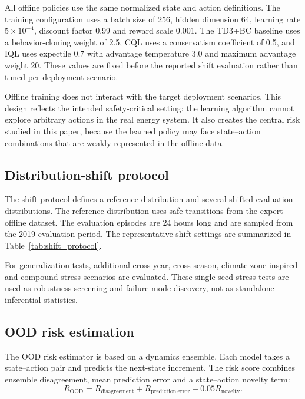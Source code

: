 \documentclass[preprint,12pt]{elsarticle}
\begin{document}
All offline policies use the same normalized state and action definitions. The training configuration uses a batch size of 256, hidden dimension 64, learning rate $5\times10^{-4}$, discount factor 0.99 and reward scale 0.001. The TD3+BC baseline uses a behavior-cloning weight of 2.5, CQL uses a conservatism coefficient of 0.5, and IQL uses expectile 0.7 with advantage temperature 3.0 and maximum advantage weight 20. These values are fixed before the reported shift evaluation rather than tuned per deployment scenario.

Offline training does not interact with the target deployment scenarios. This design reflects the intended safety-critical setting: the learning algorithm cannot explore arbitrary actions in the real energy system. It also creates the central risk studied in this paper, because the learned policy may face state--action combinations that are weakly represented in the offline data.

\subsection{Distribution-shift protocol}

The shift protocol defines a reference distribution and several shifted evaluation distributions. The reference distribution uses safe transitions from the expert offline dataset. The evaluation episodes are 24 hours long and are sampled from the 2019 evaluation period. The representative shift settings are summarized in Table~\ref{tab:shift_protocol}.



For generalization tests, additional cross-year, cross-season, climate-zone-inspired and compound stress scenarios are evaluated. These single-seed stress tests are used as robustness screening and failure-mode discovery, not as standalone inferential statistics.

\subsection{OOD risk estimation}

The OOD risk estimator is based on a dynamics ensemble. Each model takes a state--action pair and predicts the next-state increment. The risk score combines ensemble disagreement, mean prediction error and a state--action novelty term:
\begin{equation}
R_{\mathrm{OOD}} =
R_{\mathrm{disagreement}} +
R_{\mathrm{prediction\ error}} +
0.05 R_{\mathrm{novelty}} .
\end{equation}
\end{document}
